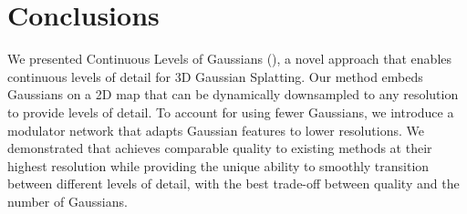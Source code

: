 \section{Conclusions}
  We presented Continuous Levels of Gaussians (\clog), a novel approach that
  enables continuous levels of detail for 3D Gaussian Splatting.
  Our method embeds Gaussians on a 2D map that can be dynamically downsampled to
  any resolution to provide levels of detail.
  To account for using fewer Gaussians, we introduce a modulator network that
  adapts Gaussian features to lower resolutions.
  We demonstrated that \clog achieves comparable quality to existing methods at
  their highest resolution while providing the unique ability to smoothly
  transition between different levels of detail, with the best trade-off between
  quality and the number of Gaussians.
